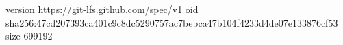 version https://git-lfs.github.com/spec/v1
oid sha256:47cd207393ca401c9c8dc5290757ac7bebca47b104f4233d4de07e133876cf53
size 699192
